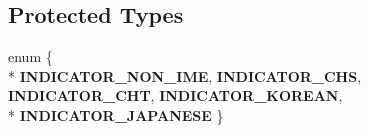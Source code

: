 \subsection*{Protected Types}
\begin{DoxyCompactItemize}
\item 
\hypertarget{class_c_d_x_u_t_i_m_e_edit_box_a0dc677f4282ac229008b9a5686482cc2}{enum \{ \\*
{\bfseries I\+N\+D\+I\+C\+A\+T\+O\+R\+\_\+\+N\+O\+N\+\_\+\+I\+M\+E}, 
{\bfseries I\+N\+D\+I\+C\+A\+T\+O\+R\+\_\+\+C\+H\+S}, 
{\bfseries I\+N\+D\+I\+C\+A\+T\+O\+R\+\_\+\+C\+H\+T}, 
{\bfseries I\+N\+D\+I\+C\+A\+T\+O\+R\+\_\+\+K\+O\+R\+E\+A\+N}, 
\\*
{\bfseries I\+N\+D\+I\+C\+A\+T\+O\+R\+\_\+\+J\+A\+P\+A\+N\+E\+S\+E}
 \}}\label{class_c_d_x_u_t_i_m_e_edit_box_a0dc677f4282ac229008b9a5686482cc2}

\end{DoxyCompactItemize}
